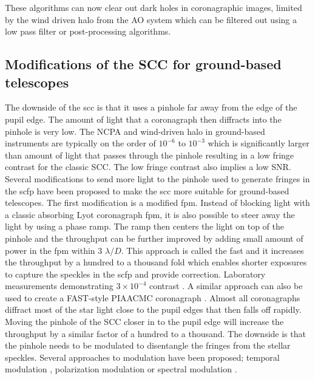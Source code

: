 \documentclass[letterpaper]{ar-1col}
\newcommand{\ld}{$\lambda/D$}
\begin{document}
These algorithms can now clear out dark holes in coronagraphic images, limited by the wind driven halo from the AO system which can be filtered out using a low pass filter or post-processing algorithms.


\subsection{Modifications of the SCC for ground-based telescopes}
The downside of the \ac{scc} is that it uses a pinhole far away from the edge of the pupil edge. The amount of light that a coronagraph then diffracts into the pinhole is very low. The NCPA and wind-driven halo in ground-based instruments are typically on the order of $10^{-6}$ to $10^{-3}$ which is significantly larger than amount of light that passes through the pinhole resulting in a low fringe contrast for the classic SCC. The low fringe contrast also implies a low SNR. Several modifications to send more light to the pinhole used to generate fringes in the \ac{scfp} have been proposed to make the \ac{scc} more suitable for ground-based telescopes.
%
The first modification is a modified \ac{fpm}. Instead of blocking light with a classic absorbing Lyot coronagraph \ac{fpm}, it is also possible to steer away the light by using a phase ramp. The ramp then centers the light on top of the pinhole and the throughput can be further improved by adding small amount of power in the \ac{fpm} within 3 \ld{}. This approach is called the \acl{fast} \citep[\acs{fast}; ][]{Gerard18} and it increases the throughput by a hundred to a thousand fold which enables shorter exposures to capture the speckles in the \ac{scfp} and provide correction. Laboratory measurements demonstrating $3\times 10^{-4}$ contrast \citep{Gerard22}. A similar approach can also be used to create a FAST-style PIAACMC coronagraph \citep{Haffert23a}.
%
Almost all coronagraphs diffract most of the star light close to the pupil edges that then falls off rapidly. Moving the pinhole of the SCC closer in to the pupil edge will increase the throughput by a similar factor of a hundred to a thousand. The downside is that the pinhole needs to be modulated to disentangle the fringes from the stellar speckles. Several approaches to modulation have been proposed; temporal modulation \citep{martinez2019fast}, polarization modulation \citep{bos2021polarization} or spectral modulation \citep{Haffert22a}.
\end{document}
